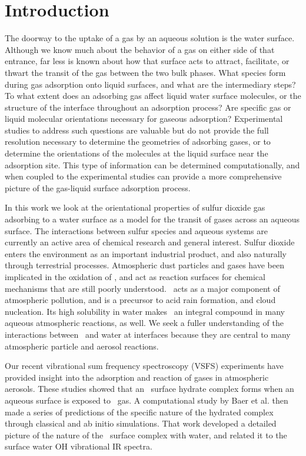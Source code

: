 \section{Introduction}

The doorway to the uptake of a gas by an aqueous solution is the water surface. Although we know much about the behavior of a gas on either side of that entrance, far less is known about how that surface acts to attract, facilitate, or thwart the transit of the gas between the two bulk phases. What species form during gas adsorption onto liquid surfaces, and what are the intermediary steps?  To what extent does an adsorbing gas affect liquid water surface molecules, or the structure of the interface throughout an adsorption process?  Are specific gas or liquid molecular orientations necessary for gaseous adsorption?  Experimental studies to address such questions are valuable but do not provide the full resolution necessary to determine the geometries of adsorbing gases, or to determine the orientations of the molecules at the liquid surface near the adsorption site.
This type of information can be determined computationally, and when coupled to the experimental studies can provide a more comprehensive picture of the gas-liquid surface adsorption process.

In this work we look at the orientational properties of sulfur dioxide gas adsorbing to a water surface as a model for the transit of gases across an aqueous surface.  The interactions between sulfur species and aqueous systems are currently an active area of chemical research and general interest.\cite{Lattanzi2010,Shah2011,Tzivian2011,Johns2011,Faloona2009,Jurkat2010,Wu2011} Sulfur dioxide enters the environment as an important industrial product, and also naturally through terrestrial processes. Atmospheric dust particles and gases have been implicated in the oxidation of \suldiox, and act as reaction surfaces for chemical mechanisms that are still poorly understood.\cite{Baltrusaitis2011,Rubasinghege2010,Li2007} \suldiox~acts as a major component of atmospheric pollution, and is a precursor to acid rain formation, and cloud nucleation. Its high solubility in water makes \suldiox~an integral compound in many aqueous atmospheric reactions, as well. We seek a fuller understanding of the interactions between \suldiox~and water at interfaces because they are central to many atmospheric particle and aerosol reactions.

Our recent vibrational sum frequency spectroscopy (VSFS) experiments have provided insight into the adsorption and reaction of gases in atmospheric aerosols.\cite{Tarbuck2005,Tarbuck2006} These studies showed that an \suldiox~surface hydrate complex forms when an aqueous surface is exposed to \suldiox~gas. A computational study by Baer et al.\cite{Baer2010} then made a series of predictions of the specific nature of the hydrated complex through classical and ab initio simulations. That work developed a detailed picture of the nature of the \suldiox~surface complex with water, and related it to the surface water OH vibrational IR spectra.

